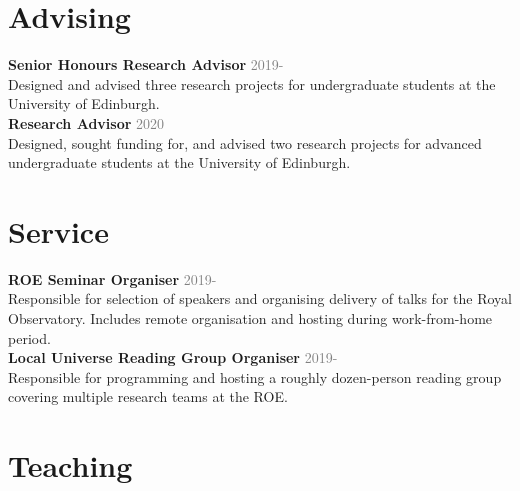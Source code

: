 \documentclass[margin, 11pt]{res} %
\begin{document}
\begin{resume}

%


\section{\sc \textcolor{redshade}{Advising}}


{\bf Senior Honours Research Advisor} \hfill\textcolor{grey}{2019-}\\
Designed and advised three research projects for undergraduate students at the University of Edinburgh.\\

{\bf Research Advisor} \hfill\textcolor{grey}{2020}\\
Designed, sought funding for, and advised two research projects for advanced undergraduate students at the University of Edinburgh.



\section{\sc \textcolor{redshade}{Service}}

{\bf ROE Seminar Organiser} \hfill\textcolor{grey}{2019-}\\
Responsible for selection of speakers and organising delivery of talks for the Royal Observatory. Includes remote organisation and hosting during work-from-home period.\\

{\bf Local Universe Reading Group Organiser} \hfill\textcolor{grey}{2019-}\\
Responsible for programming and hosting a roughly dozen-person reading group covering multiple research teams at the ROE.

\section{\sc \textcolor{redshade}{Teaching}}


\end{resume}
\end{document}
